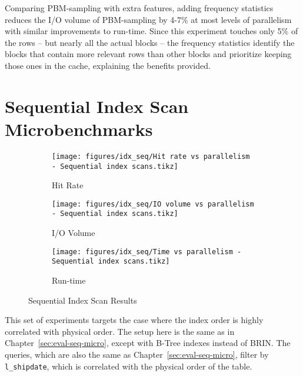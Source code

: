 Comparing PBM-sampling with extra features, adding frequency statistics reduces the I/O volume of PBM-sampling by 4-7\% at most levels of parallelism with similar improvements to run-time. Since this experiment touches only 5\% of the rows -- but nearly all the actual blocks -- the frequency statistics identify the blocks that contain more relevant rows than other blocks and prioritize keeping those ones in the cache, explaining the benefits provided.




\section{Sequential Index Scan Microbenchmarks}


\begin{figure}
\centering
    \begin{subfigure}{0.45\textwidth}
        \centering
        \texttt{[image: figures/idx\_seq/Hit rate vs parallelism - Sequential index scans.tikz]}
        \caption{Hit Rate}
    \end{subfigure}\hspace{0.05\textwidth}%
    \begin{subfigure}{0.45\textwidth}
        \centering
        \texttt{[image: figures/idx\_seq/IO volume vs parallelism - Sequential index scans.tikz]}
        \caption{I/O Volume}
    \end{subfigure}
    
\vspace{20pt}
    \begin{subfigure}{0.45\textwidth}
        \centering
        \texttt{[image: figures/idx\_seq/Time vs parallelism - Sequential index scans.tikz]}
        \caption{Run-time}
    \end{subfigure}

    \caption{Sequential Index Scan Results}
    \label{fig:idx_seq}
\end{figure}

This set of experiments targets the case where the index order is highly correlated with physical order. The setup here is the same as in Chapter~\ref{sec:eval-seq-micro}, except with B-Tree indexes instead of BRIN. The queries, which are also the same as Chapter~\ref{sec:eval-seq-micro}, filter by \verb|l_shipdate|, which is correlated with the physical order of the table. %

